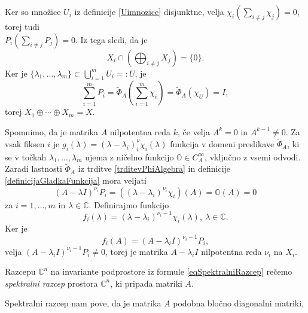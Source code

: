 \documentclass[mat1]{fmfdelo}
\newcommand{\C}{\mathbb C}
\begin{document}
\begin{dokaz}
    Ker so množice $U_i$ iz definicije \ref{Uimnozice} disjunktne, velja $\chi_i\left(\sum_{i \neq j} \chi_j\right) = 0$, torej tudi \\ $P_i\left(\sum_{i \neq j} P_j\right) = 0$. Iz tega sledi, da je
    \begin{equation*}
        X_i \cap \left(\bigoplus_{i \neq j} X_j\right) = \{0\}.
    \end{equation*}
    Ker je $\{\lambda_1, \ldots, \lambda_m\} \subset \bigcup_{i = 1}^m U_i =: U$, je
    \begin{equation*}
        \sum_{i = 1}^m P_i = \widetilde{\Phi}_A \left(\sum_{i=1}^m \chi_i \right) = \widetilde{\Phi}_A (\chi_U) = I,
    \end{equation*}
    torej $X_1 \oplus \cdots \oplus X_m = X$.
    
    Spomnimo, da je matrika $A$ nilpotentna reda $k$, če velja $A^k = 0$ in $A^{k-1} \neq 0$. Za vsak fiksen $i$ je $g_i(\lambda) = (\lambda - \lambda_i)^\nu_i \chi_i(\lambda)$ funkcija v domeni preslikave $\widetilde{\Phi}_A$, ki se v točkah $\lambda_1, \ldots, \lambda_m$ ujema z ničelno funkcijo $\mathbb{O} \in C_A^{\infty}$, vključno z vsemi odvodi. Zaradi lastnosti $\widetilde{\Phi}_A$ iz trditve \ref{trditevPhiAlgebra} in definicije \ref{definicijaGladkaFunkcija} mora veljati
    \begin{equation*}
        (A - \lambda I)^{\nu_i} P_i = \left(\left(\lambda - \lambda_i \right)^{\nu_i} \chi_i \right) (A) = \mathbb{O}(A) = 0
    \end{equation*}
    za $i = 1, \ldots, m$ in $\lambda \in \C$. Definirajmo funkcijo
    \begin{equation*}
        f_i(\lambda) = (\lambda - \lambda_i)^{\nu_i - 1} \chi_i(\lambda),\ \lambda \in \C.
    \end{equation*}
    Ker je
    \begin{equation*}
        f_i(A) = (A - \lambda_i I)^{\nu_i-1} P_i,
    \end{equation*}
    velja $(A - \lambda_i I)^{\nu_i-1} P_i \neq 0$, torej je matrika $A - \lambda_i I$ nilpotentna reda $\nu_i$ na $X_i$.
\end{dokaz}
\begin{definicija}
    Razcepu $\C^n$ na invariante podprostore iz formule \eqref{eqSpektralniRazcep} rečemo \emph{spektralni razcep} prostora $\C^n$, ki pripada matriki $A$. 
\end{definicija}
Spektralni razcep nam pove, da je matrika $A$ podobna bločno diagonalni matriki,
\end{document}
